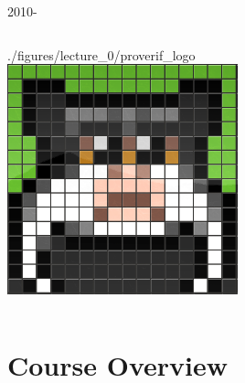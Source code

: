 \documentclass[11pt,aspectratio=169]{beamer}
\begin{document}
\begin{frame}[fragile]{2010-}
\begin{columns}
\begin{column}{0.3\textwidth}
                {./figures/lecture_0/proverif_logo}\\[.5cm]
            \includegraphics[width=0.5\textwidth]
                {./figures/lecture_0/tamarin_logo_pixel}
        \end{column}
    \end{columns}
\end{frame}


\section{Course Overview}

\end{document}
